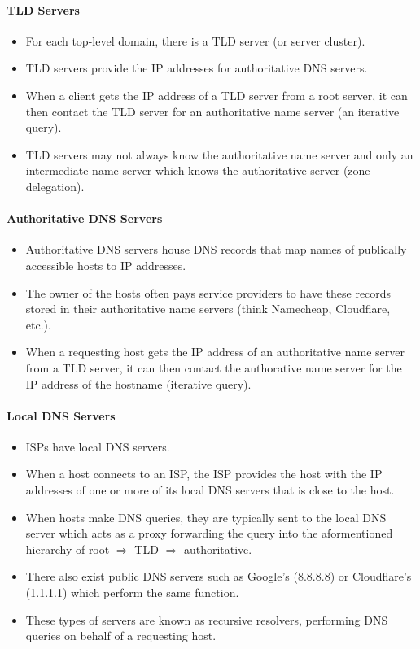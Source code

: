 \documentclass{article}
\begin{document}
\paragraph{TLD Servers}

\begin{itemize}
    \item For each top-level domain, there is a TLD server (or server cluster).
    \item TLD servers provide the IP addresses for authoritative DNS servers.
    \item When a client gets the IP address of a TLD server from a root server, it can then contact the TLD server for an authoritative name server (an iterative query).
    \item TLD servers may not always know the authoritative name server and only an intermediate name server which knows the authoritative server (zone delegation).
\end{itemize}

\paragraph{Authoritative DNS Servers}

\begin{itemize}
    \item Authoritative DNS servers house DNS records that map names of publically accessible hosts to IP addresses.
    \item The owner of the hosts often pays service providers to have these records stored in their authoritative name servers (think Namecheap, Cloudflare, etc.).
    \item When a requesting host gets the IP address of an authoritative name server from a TLD server, it can then contact the authorative name server for the IP address of the hostname (iterative query).
\end{itemize}

\paragraph{Local DNS Servers}

\begin{itemize}
    \item ISPs have local DNS servers.
    \item When a host connects to an ISP, the ISP provides the host with the IP addresses of one or more of its local DNS servers that is close to the host.
    \item When hosts make DNS queries, they are typically sent to the local DNS server which acts as a proxy forwarding the query into the aformentioned hierarchy of root $\Rightarrow$ TLD $\Rightarrow$ authoritative.
    \item There also exist public DNS servers such as Google's (8.8.8.8) or Cloudflare's (1.1.1.1) which perform the same function.
    \item These types of servers are known as recursive resolvers, performing DNS queries on behalf of a requesting host.
\end{itemize}
\end{document}
